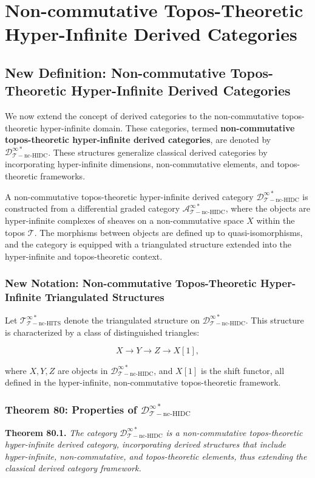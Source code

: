 \documentclass{article}
\begin{document}

\section{Non-commutative Topos-Theoretic Hyper-Infinite Derived Categories}
\subsection{New Definition: Non-commutative Topos-Theoretic Hyper-Infinite Derived Categories}
We now extend the concept of derived categories to the non-commutative topos-theoretic hyper-infinite domain. These categories, termed \textbf{non-commutative topos-theoretic hyper-infinite derived categories}, are denoted by \(\mathcal{D}_{\mathcal{T}-\text{nc-HIDC}}^{\infty *}\). These structures generalize classical derived categories by incorporating hyper-infinite dimensions, non-commutative elements, and topos-theoretic frameworks.

A non-commutative topos-theoretic hyper-infinite derived category \(\mathcal{D}_{\mathcal{T}-\text{nc-HIDC}}^{\infty *}\) is constructed from a differential graded category \(\mathcal{A}_{\mathcal{T}-\text{nc-HIDC}}^{\infty *}\), where the objects are hyper-infinite complexes of sheaves on a non-commutative space \(X\) within the topos \(\mathcal{T}\). The morphisms between objects are defined up to quasi-isomorphisms, and the category is equipped with a triangulated structure extended into the hyper-infinite and topos-theoretic context.

\subsubsection{New Notation: Non-commutative Topos-Theoretic Hyper-Infinite Triangulated Structures}
Let \(\mathcal{T}_{\mathcal{T}-\text{nc-HITS}}^{\infty *}\) denote the triangulated structure on \(\mathcal{D}_{\mathcal{T}-\text{nc-HIDC}}^{\infty *}\). This structure is characterized by a class of distinguished triangles:

\[
X \to Y \to Z \to X[1],
\]

where \(X, Y, Z\) are objects in \(\mathcal{D}_{\mathcal{T}-\text{nc-HIDC}}^{\infty *}\), and \(X[1]\) is the shift functor, all defined in the hyper-infinite, non-commutative topos-theoretic framework.

\subsubsection{Theorem 80: Properties of \(\mathcal{D}_{\mathcal{T}-\text{nc-HIDC}}^{\infty *}\)}
\textbf{Theorem 80.1.} \textit{The category \(\mathcal{D}_{\mathcal{T}-\text{nc-HIDC}}^{\infty *}\) is a non-commutative topos-theoretic hyper-infinite derived category, incorporating derived structures that include hyper-infinite, non-commutative, and topos-theoretic elements, thus extending the classical derived category framework.}
\end{document}
